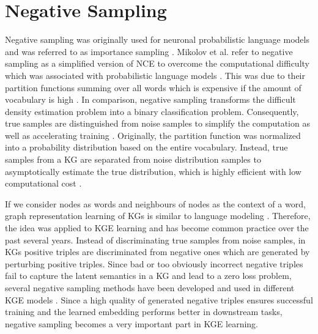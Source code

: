 \section{Negative Sampling}
\label{sec:negative_sampling}

Negative sampling was originally used for neuronal probabilistic language models and was referred to as importance sampling \cite{qiannegative, qianunderstanding}.
Mikolov et al. \cite{MikolovSCCD13} refer to negative sampling as a simplified version of \ac{NCE} to overcome the computational difficulty which was associated with probabilistic language models \cite{qianunderstanding}.
This was due to their partition functions summing over all words which is expensive if the amount of vocabulary is high \cite{qianunderstanding}.
In comparison, negative sampling transforms the difficult density estimation problem into a binary classification problem.
Consequently,  true samples are distinguished from noise samples to simplify the computation as well as accelerating training \cite{qianunderstanding}.
Originally, the partition function was normalized into a probability distribution based on the entire vocabulary.
Instead, true samples from a \ac{KG} are separated from noise distribution samples to asymptotically estimate the true distribution, which is highly efficient with low computational cost \cite{qianunderstanding}.

If we consider nodes as words and neighbours of nodes as the context of a word, graph representation learning of \acp{KG} is similar to language modeling \cite{qianunderstanding}.
Therefore, the idea was applied to \ac{KGE} learning and has become common practice over the past several years.
Instead of discriminating true samples from noise samples, in \acp{KG} positive triples are discriminated from negative ones which are generated by perturbing positive triples.
Since bad or too obviously incorrect negative triples fail to capture the latent semantics in a \ac{KG} and lead to a zero loss problem, several negative sampling methods have been developed and used in different \ac{KGE} models \cite{qiannegative}.
Since a high quality of generated negative triples ensures successful training and the learned embedding performs better in downstream tasks, negative sampling becomes a very important part in \ac{KGE} learning.


